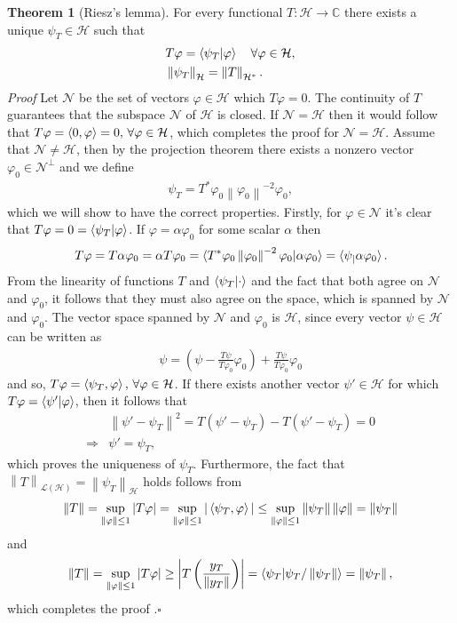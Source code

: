 \documentclass[a4paper,12pt]{wihuri}
\theoremstyle{definition}
\newtheorem{theorem}{Theorem}
\numberwithin{definition}{section}
\numberwithin{example}{section}
\numberwithin{theorem}{section}
\numberwithin{proposition}{section}
\numberwithin{lemma}{section}
\newcommand{\hi}{\mathcal{H}}%
\newcommand{\N}{\mathcal{N}}%
\newcommand{\lin}{\mathcal{L}}%
\newcommand{\norm}[1]{\left\lVert#1\right\rVert}
\begin{document}
\begin{theorem}[Riesz's lemma]
For every functional $T:\hi \rightarrow \mathbb{C}$ there exists a unique $\psi_T \in \hi$ such that 
\begin{align*}
&T\varphi = \braket{\psi_T | \varphi} \quad \forall \varphi \in \hi,\\
&\norm{\psi_T}_\hi = \norm{T}_{\hi^*}\text.
\end{align*}
\textit{Proof} Let $\N$ be the set of vectors $\varphi \in \hi$ which $T\varphi = 0$. The continuity of $T$ guarantees that the subspace $\N$ of $\hi$ is closed. If $\N = \hi$ then it would follow that $T\varphi =\braket{0,\varphi} = 0, \, \forall \varphi\in \hi$, which completes the proof for $\N = \hi$. Assume that $\N \neq \hi$, then by the projection theorem\cite{reed_simon_math_physics} there exists a nonzero vector $\varphi_0 \in \N^\perp$ and we define
\begin{align*}
\psi_T = T^*\varphi_0\norm{\varphi_0}^{-2}\varphi_0,
\end{align*} 
which we will show to have the correct properties. Firstly, for $\varphi \in \N$ it's clear that $T\varphi = 0 = \braket{\psi_T| \varphi}$. If $\varphi = \alpha\varphi_0$ for some scalar $\alpha$ then
\begin{align*}
T\varphi = T\alpha\varphi_0 = \alpha T\varphi_0 = \braket{T^*\varphi_0\norm{\varphi_0}^{-2}\varphi_0 | \alpha\varphi_0} = \braket{\psi_| \alpha\varphi_0}\text.
\end{align*}
From the linearity of functions $T$ and $\braket{\psi_T | \cdot}$ and the fact that both agree on $\N$ and $\varphi_0$, it follows that they must also agree on the space, which is spanned by $\N$ and $\varphi_0$. The vector space spanned by $\N$ and $\varphi_0$ is $\hi$, since every vector $\psi \in \hi$ can be written as
\begin{align*}
\psi = \left(\psi - \frac{T\psi}{T\varphi_0}\varphi_0 \right) + \frac{T\psi}{T\varphi_0}\varphi_0
\end{align*}
and so, $T\varphi = \braket{\psi_T, \varphi},\, \forall \varphi \in \hi$. If there exists another vector $\psi'\in\hi$ for which $T\varphi = \braket{\psi'|\varphi}$, then it follows that 
\begin{align*}
&\norm{\psi' - \psi_T}^2 = T(\psi' - \psi_T) - T(\psi' - \psi_T) = 0 \\
\Rightarrow& \psi' = \psi_T,
\end{align*}
which proves the uniqueness of $\psi_T$. Furthermore, the fact that $\norm{T}_{\lin(\hi)} = \norm{\psi_T}_\hi$ holds follows from
\begin{align*}
\norm{T} = \sup_{\norm{\varphi} \leq 1} |T\varphi| = \sup_{\norm{\varphi} \leq 1} |\braket{\psi_T,\varphi}| \leq \sup_{\norm{\varphi} \leq 1} \norm{\psi_T}\norm{\varphi} = \norm{\psi_T}
\end{align*}
and
\begin{align*}
\norm{T} = \sup_{\norm{\varphi} \leq 1} |T\varphi| \geq \left| T\left(\frac{y_T}{\norm{y_T}} \right) \right| = \braket{\psi_T | \psi_T / \norm{\psi_T}} = \norm{\psi_T},
\end{align*}
which completes the proof \cite{reed_simon_math_physics}.\hfill $\square$
\end{theorem}
\end{document}
